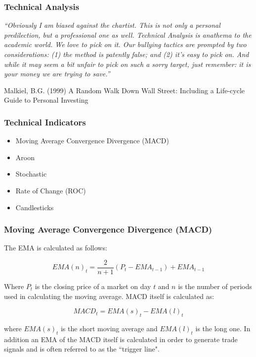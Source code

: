 \documentclass{beamer}
\begin{document}
\begin{frame}
\frametitle{Technical Analysis}

\textit{\textquotedblleft Obviously I am biased against the chartist. This is not only a personal predilection, but a professional one as well. Technical Analysis is anathema to the academic world. We love to pick on it. Our bullying tactics are prompted by two considerations: (1) the method is patently false; and (2) it's easy to pick on. And while it may seem a bit unfair to pick on such a sorry target, just remember: it is your money we are trying to save.\textquotedblright}
\begin{thebibliography}{99} %
 Malkiel, B.G. (1999)
\newblock A Random Walk Down Wall Street: Including a Life-cycle Guide to Personal Investing
\end{thebibliography}

\end{frame}

\begin{frame}
\frametitle{Technical Indicators}

\begin{itemize}
\item Moving Average Convergence Divergence (MACD) \pause
\item Aroon \pause
\item Stochastic \pause
\item Rate of Change (ROC) \pause
\item Candlesticks 
\end{itemize}

\end{frame}

\begin{frame}
\frametitle{Moving Average Convergence Divergence (MACD)}

 The EMA is calculated as follows:

\[ EMA(n)_{t} = \dfrac{2}{n+1}(P_{t}-EMA_{t-1}) + EMA_{t-1}\]

Where $ P_{t} $ is the closing price of a market on day $ t $ and $ n $ is the number of periods used in calculating the moving average. MACD itself is calculated as:

\[ MACD_{t} = EMA(s)_{t} - EMA(l)_{t} \]

where $ EMA(s)_{t} $ is the short moving average and $ EMA(l)_{t} $ is the long one. In addition an EMA of the MACD itself is calculated in order to generate trade signals and is often referred to as the \textquotedblleft trigger line".

\end{frame}
\end{document}
